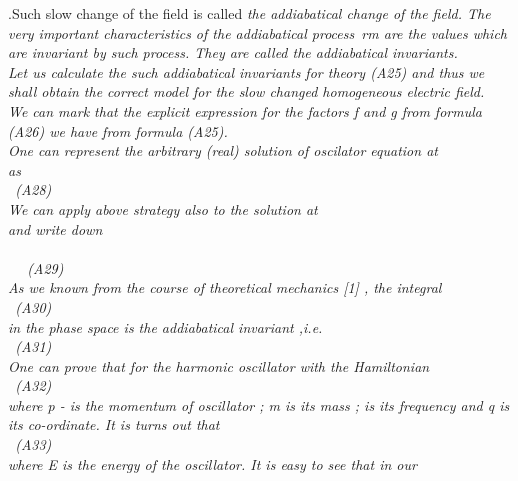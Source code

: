 \documentclass[a4paper,12pt] {article}
\begin{document}
\coordHE{}.Such slow change of the field is called \it the addiabatical change \rm  of the field. The very
important characteristics of the  \it addiabatical process\ rm  are the values which are \it  invariant \rm  by
 such process. They are called \it the addiabatical invariants.\\  \rm Let us calculate the such
addiabatical invariants for theory (A25) and thus we shall obtain the correct model \it  for the slow
changed  homogeneous electric field.
\\  \rm  We can mark  that the explicit expression for the factors f and g from formula  (A26) we have  from
 formula  (A25).\\ One can represent the arbitrary (real) solution of  oscilator equation at\\ \coordHE{} as
 \\\coordHE{} \ (A28) \\ We can apply  above strategy also to the solution at\\ \coordHE{} and write down \\\coordHE{} \\\ \coordHE{} \ (A29)\\ As we
 known from the course of theoretical mechanics [1] , the integral \\\coordHE{} \ (A30)
\\ in the phase space \it is the addiabatical invariant ,\rm  i.e. \\ \coordHE{} \ (A31)\\  One
 can prove that for the harmonic oscillator with the Hamiltonian
\\\coordHE{} \ (A32)\\ where p - is the momentum of oscillator ;
 m is its mass ; \myHighlight{$ \omega $}\coordHE{} is its frequency and q is its co-ordinate. It is turns out that
\\ \coordHE{} \ (A33)\\ where E is the energy of the oscillator. It is easy to see that in our
\end{document}
